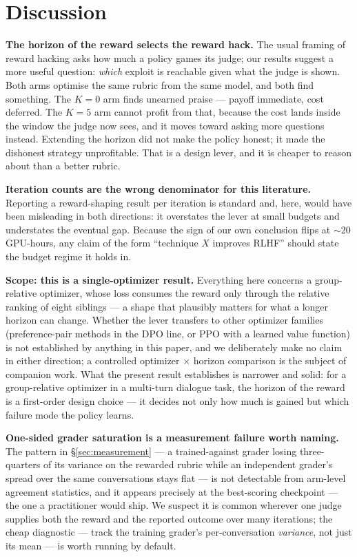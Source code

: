 \section{Discussion}
\label{sec:discussion}

\textbf{The horizon of the reward selects the reward hack.} The usual framing of reward hacking
asks how much a policy games its judge; our results suggest a more useful question: \emph{which}
exploit is reachable given what the judge is shown. Both arms optimise the same rubric from the
same model, and both find something. The $K{=}0$ arm finds unearned praise --- payoff immediate,
cost deferred. The $K{=}5$ arm cannot profit from that, because the cost lands inside the window
the judge now sees, and it moves toward asking more questions instead. Extending the horizon did
not make the policy honest; it made the dishonest strategy unprofitable. That is a design lever,
and it is cheaper to reason about than a better rubric.

\textbf{Iteration counts are the wrong denominator for this literature.} Reporting a
reward-shaping result per iteration is standard and, here, would have been misleading in both
directions: it overstates the lever at small budgets and understates the eventual gap. Because the
sign of our own conclusion flips at ${\sim}20$ GPU-hours, any claim of the form ``technique $X$
improves RLHF'' should state the budget regime it holds in.

\textbf{Scope: this is a single-optimizer result.} Everything here concerns a group-relative
optimizer, whose loss consumes the reward only through the relative ranking of eight siblings ---
a shape that plausibly matters for what a longer horizon can change. Whether the lever transfers
to other optimizer families (preference-pair methods in the DPO line, or PPO with a learned value
function) is not established by anything in this paper, and we deliberately make no claim in
either direction; a controlled optimizer $\times$ horizon comparison is the subject of companion
work. What the present result establishes is narrower and solid: for a group-relative optimizer
in a multi-turn dialogue task, the horizon of the reward is a first-order design choice --- it
decides not only how much is gained but which failure mode the policy learns.

\textbf{One-sided grader saturation is a measurement failure worth naming.} The pattern in
\S\ref{sec:measurement} --- a trained-against grader losing three-quarters of its variance on the
rewarded rubric while an independent grader's spread over the same conversations stays flat --- is
not detectable from arm-level agreement statistics, and it appears precisely at the best-scoring
checkpoint --- the one a practitioner would ship. We suspect it is common wherever one judge
supplies both the reward and the reported outcome over many iterations; the cheap diagnostic ---
track the training grader's per-conversation \emph{variance}, not just its mean --- is worth
running by default.

